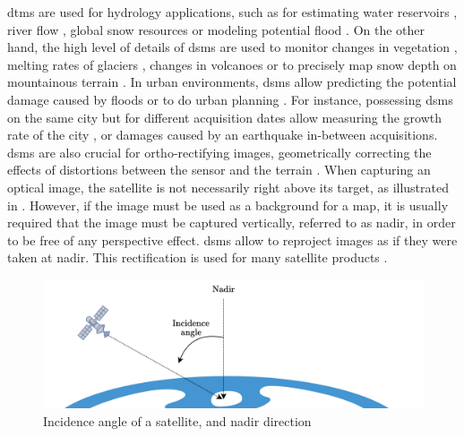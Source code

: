 \acrshort{dtm}s are used for hydrology applications, such as for estimating water reservoirs \cite{yamazaki_merit_2019}, river flow \cite{miguez-macho_incorporating_2007}, global snow resources \cite{gascoin_theia_2019} or modeling potential flood \cite{yamazaki_regional_2014}. On the other hand, the high level of details of \acrshort{dsm}s are used to monitor changes in vegetation \cite{sadeghi_canopy_2016}, melting rates of glaciers \cite{berthier_glacier_2014, rieg_pleiades_2018}, changes in volcanoes \cite{ganci_data_2022} or to precisely map snow depth on mountainous terrain \cite{marti_mapping_2016}. In urban environments, \acrshort{dsm}s allow predicting the potential damage caused by floods \cite{jenkins_physics-based_2023} or to do urban planning \cite{velazco_3d_2012}. For instance, possessing \acrshort{dsm}s on the same city but for different acquisition dates allow measuring the growth rate of the city \cite{warth_dsm-based_2019}, or damages caused by an earthquake \cite{erdogan_detection_2019} in-between acquisitions. \acrshort{dsm}s are also crucial for ortho-rectifying images, \ie geometrically correcting the effects of distortions between the sensor and the terrain \cite{toutin_ortho-rectification_2012}. When capturing an optical image, the satellite is not necessarily right above its target, as illustrated in . However, if the image must be used as a background for a map, it is usually required that the image must be captured vertically, referred to as nadir, in order to be free of any perspective effect. \acrshort{dsm}s allow to reproject images as if they were taken at nadir. This rectification is used for many satellite products \cite{hagolle_maja_2017}.  
\begin{figure}
    \centering
    \includegraphics[width=0.7\linewidth]{Images/Chap_1/Ortho_Nadir.png}
    \caption{Incidence angle of a satellite, and nadir direction}
    \label{fig:ortho_nadir}
\end{figure}

